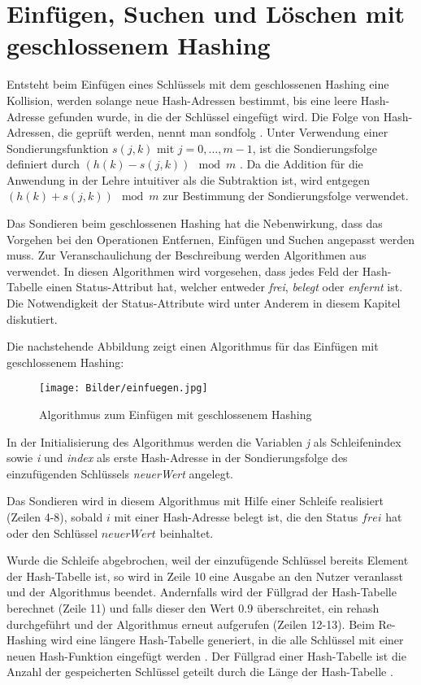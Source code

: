 \section{Einfügen, Suchen und Löschen mit geschlossenem Hashing}\label{loesch}
Entsteht beim Einfügen eines Schlüssels mit dem geschlossenen Hashing eine Kollision, werden solange neue Hash-Adressen bestimmt, bis eine leere Hash-Adresse gefunden wurde, in die der Schlüssel eingefügt wird. Die Folge von Hash-Adressen, die geprüft werden, nennt man \Gls{sondfolg} \cite[S.~203]{ADSOttWid}. Unter Verwendung einer Sondierungsfunktion \(s(j,k)\) mit \(j=0, \dots{},m-1\), ist die Sondierungsfolge definiert durch \((h(k)-s(j,k))\mod{m}\) \cite[S.~204]{ADSOttWid}. Da die Addition für die Anwendung in der Lehre intuitiver als die Subtraktion ist, wird entgegen \cite{ADSOttWid} \((h(k)+s(j,k))\mod{m}\) zur Bestimmung der Sondierungsfolge verwendet.

Das Sondieren beim geschlossenen Hashing hat die Nebenwirkung, dass das Vorgehen bei den Operationen Entfernen, Einfügen und Suchen angepasst werden muss. Zur Veranschaulichung der Beschreibung werden Algorithmen aus \cite[ch.~9.4.4-9.4.5]{ADSWeiWei} verwendet. In diesen Algorithmen wird vorgesehen, dass jedes Feld der Hash-Tabelle einen Status-Attribut hat, welcher entweder \textit{frei}, \textit{belegt} oder \textit{enfernt} ist. Die Notwendigkeit der Status-Attribute wird unter Anderem in diesem Kapitel diskutiert.

Die nachstehende Abbildung zeigt einen Algorithmus für das Einfügen mit geschlossenem Hashing:
\begin{figure}[H]
	\centering
	\texttt{[image: Bilder/einfuegen.jpg]}
	\caption{Algorithmus zum Einfügen mit geschlossenem Hashing}
	\label{ht_einfuegen}
	\quelle \cite[S.~244]{ADSWeiWei}
\end{figure}

In der Initialisierung des Algorithmus werden die Variablen \textit{j} als Schleifenindex sowie \textit{i} und \textit{index} als erste Hash-Adresse in der Sondierungsfolge des einzufügenden Schlüssels \textit{neuerWert} angelegt. 

Das Sondieren wird in diesem Algorithmus mit Hilfe einer Schleife realisiert (Zeilen 4-8), sobald \(i\) mit einer Hash-Adresse belegt ist, die den Status \(frei\) hat oder den Schlüssel \(neuerWert\) beinhaltet.

Wurde die Schleife abgebrochen, weil der einzufügende Schlüssel bereits Element der Hash-Tabelle ist, so wird in Zeile 10 eine Ausgabe an den Nutzer veranlasst und der Algorithmus beendet. Andernfalls wird der Füllgrad der Hash-Tabelle berechnet (Zeile 11) und falls dieser den Wert \(0.9\) überschreitet, ein \Gls{rehash} durchgeführt und der Algorithmus erneut aufgerufen (Zeilen 12-13). Beim Re-Hashing wird eine längere Hash-Tabelle generiert, in die alle Schlüssel mit einer neuen Hash-Funktion eingefügt werden \cite[S.~244]{ADSWeiWei}. Der Füllgrad einer Hash-Tabelle ist die Anzahl der gespeicherten Schlüssel geteilt durch die Länge der Hash-Tabelle \cite[S.~244]{ADSWeiWei}. 

